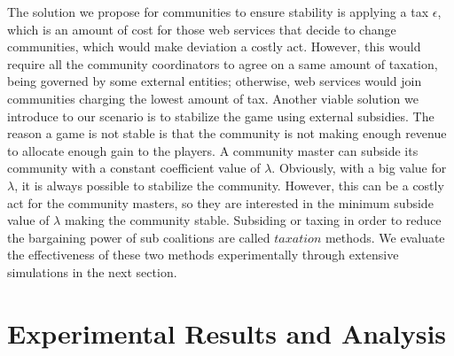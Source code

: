 \documentclass[10pt,journal,cspaper,compsoc]{IEEEtran}
\begin{document}
The solution we propose for communities to ensure  stability is
applying a tax $\epsilon$, which is an amount of cost for those
web services that decide to change communities, which would make
deviation a costly act. However, this would require all the
community coordinators to agree on a same amount of taxation,
being governed by some external entities; otherwise, web services
would join communities charging the lowest amount of tax. Another
viable solution we introduce to our scenario is to stabilize the
game using external subsidies. The reason a game is not stable is
that the community is not making enough revenue to allocate enough
gain to the players. A community master can subside its community
with a constant coefficient value of $\lambda$.
%
%
Obviously, with a big value for $\lambda$, it is always possible
to stabilize the community. However, this can be a costly act for
the community masters, so they are interested in the minimum
subside value of $\lambda$ making the community stable. Subsiding
or taxing in order to reduce the bargaining power of sub
coalitions are called $taxation$ \cite{eps346856} methods. We
evaluate the effectiveness of these two methods experimentally
through extensive simulations in the next section.






\section{Experimental Results and Analysis}\label{s:resutls}
\end{document}
